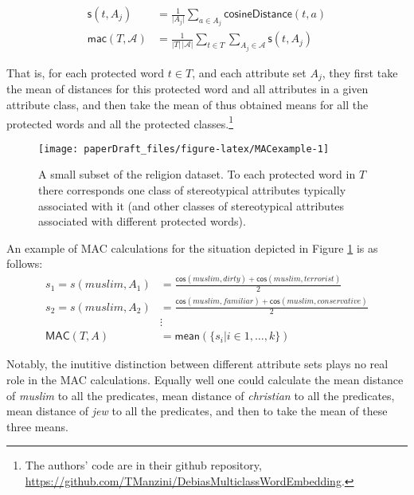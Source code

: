\documentclass[
  12pt,
  dvipsnames,enabledeprecatedfontcommands]{scrartcl}
\begin{document}
\begin{align*}
\mathsf{s}(t, A_j) & = \frac{1}{\vert A_j\vert}\sum_{a\in A_j}\mathsf{cosineDistance}(t,a) \\
\mathsf{mac}(T,\mathcal{A}) & = \frac{1}{\vert T \vert \,\vert \mathcal{A}\vert}\sum_{t \in T }\sum_{A_j \in \mathcal{A}}    \mathsf{s}(t,A_j)
\end{align*}

\noindent That is, for each protected word \(t\in T\), and each
attribute set \(A_j\), they first take the mean of distances for this
protected word and all attributes in a given attribute class, and then
take the mean of thus obtained means for all the protected words and all
the protected classes.\footnote{The authors' code are in their github
  repository,
  \url{https://github.com/TManzini/DebiasMulticlassWordEmbedding}.}

\begin{figure}[H]

\begin{center}\texttt{[image: paperDraft\_files/figure-latex/MACexample-1]} \end{center}
\caption{A small subset of the religion dataset.  To each protected word in $T$  there corresponds one class of stereotypical attributes typically associated with it (and other classes of stereotypical attributes associated with different protected words).}
\label{fig:MACexample}
\end{figure}

\noindent An example of \textsf{MAC} calculations for the situation
depicted in Figure \ref{fig:MACexample} is as follows: \begin{align*}
s_1   = s(muslim,A_1)  & = \frac{\mathsf{cos}(muslim,dirty)+\mathsf{cos}(muslim,terrorist)}{2} \\ 
s_2   = s(muslim,A_2)  & = \frac{\mathsf{cos}(muslim,familiar)+\mathsf{cos}(muslim,conservative)}{2}\\ & \vdots \\ 
\mathsf{MAC}(T,A)  & = \mathsf{mean}(\{s_i \vert i \in 1, \dots, k\})
\end{align*}

Notably, the inutitive distinction between different attribute sets
plays no real role in the \textsf{MAC} calculations. Equally well one
could calculate the mean distance of \emph{muslim} to all the
predicates, mean distance of \emph{christian} to all the predicates,
mean distance of \emph{jew} to all the predicates, and then to take the
mean of these three means.
\end{document}

